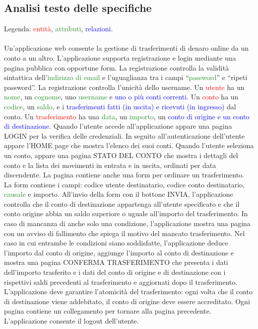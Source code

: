 \documentclass{article}
\begin{document}
\subsection{Analisi testo delle specifiche}
Legenda: \textcolor{red}{entità}, \textcolor{ForestGreen}{attributi}, \textcolor{blue}{relazioni}.
\\
\\
Un’applicazione web consente la gestione di trasferimenti di denaro online da un conto a un
altro. L’applicazione supporta registrazione e login mediante una pagina pubblica con
opportune form. La registrazione controlla la validità sintattica dell’\textcolor{ForestGreen}{indirizzo di email} e
l’uguaglianza tra i campi “\textcolor{ForestGreen}{password}” e “ripeti password”. La registrazione controlla l’unicità
dello username. Un \textcolor{red}{utente} ha un \textcolor{ForestGreen}{nome}, un \textcolor{ForestGreen}{cognome}, uno \textcolor{ForestGreen}{username} e \textcolor{blue}{uno o più conti correnti}.
Un \textcolor{red}{conto}  ha un \textcolor{ForestGreen}{codice}, un \textcolor{ForestGreen}{saldo}, e i \textcolor{blue}{trasferimenti fatti (in uscita) e ricevuti (in ingresso)} dal
conto. Un  \textcolor{red}{trasferimento} ha una \textcolor{ForestGreen}{data}, un \textcolor{ForestGreen}{importo}, un \textcolor{blue}{conto di origine e un conto di destinazione}.
Quando l’utente accede all’applicazione appare una pagina LOGIN per la verifica delle
credenziali. In seguito all’autenticazione dell’utente appare l’HOME page che mostra l’elenco
dei suoi conti. Quando l’utente seleziona un conto, appare una pagina STATO DEL CONTO
che mostra i dettagli del conto e la lista dei movimenti in entrata e in uscita, ordinati per data
discendente. La pagina contiene anche una form per ordinare un trasferimento. La form
contiene i campi: codice utente destinatario, codice conto destinatario, \textcolor{ForestGreen}{causale} e importo.
All’invio della form con il bottone INVIA, l’applicazione controlla che il conto di destinazione
appartenga all’utente specificato e che il conto origine abbia un saldo superiore o uguale
all’importo del trasferimento. In caso di mancanza di anche solo una condizione, l’applicazione
mostra una pagina con un avviso di fallimento che spiega il motivo del mancato trasferimento.
Nel caso in cui entrambe le condizioni siano soddisfatte, l’applicazione deduce l’importo dal
conto di origine, aggiunge l’importo al conto di destinazione e mostra una pagina CONFERMA
TRASFERIMENTO che presenta i dati dell’importo trasferito e i dati del conto di origine e di
destinazione con i rispettivi saldi precedenti al trasferimento e aggiornati dopo il trasferimento.
L’applicazione deve garantire l’atomicità del trasferimento: ogni volta che il conto di
destinazione viene addebitato, il conto di origine deve essere accreditato. Ogni pagina
contiene un collegamento per tornare alla pagina precedente. L’applicazione consente il
logout dell’utente.
\end{document}
